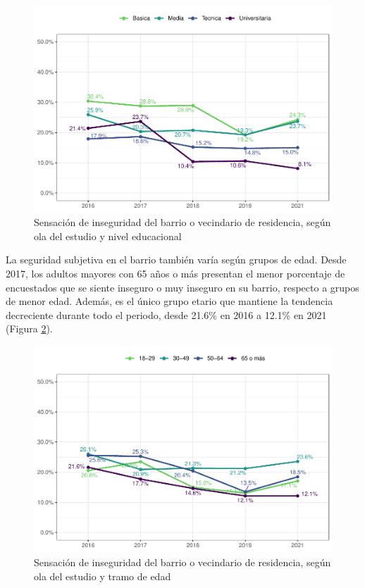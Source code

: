 \documentclass[
  12pt,
]{book}
\begin{document}
\begin{figure}

{\centering \includegraphics{reporte-elsoc_files/figure-latex/seguri-educ-1} 

}

\caption{Sensación de inseguridad del barrio o vecindario de residencia, según ola del estudio y nivel educacional}\label{fig:seguri-educ}
\end{figure}

La seguridad subjetiva en el barrio también varía según grupos de edad. Desde 2017, los adultos mayores con 65 años o más presentan el menor porcentaje de encuestados que se siente inseguro o muy inseguro en su barrio, respecto a grupos de menor edad. Además, es el único grupo etario que mantiene la tendencia decreciente durante todo el periodo, desde 21.6\% en 2016 a 12.1\% en 2021 (Figura \ref{fig:seguri-edad}).

\begin{figure}

{\centering \includegraphics{reporte-elsoc_files/figure-latex/seguri-edad-1} 

}

\caption{Sensación de inseguridad del barrio o vecindario de residencia, según ola del estudio y tramo de edad}\label{fig:seguri-edad}
\end{figure}
\end{document}
